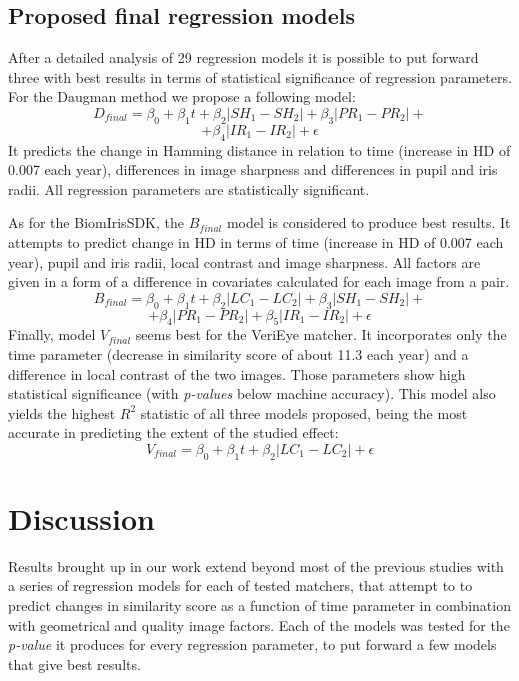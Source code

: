 \documentclass{article}
\begin{document}
\subsection{Proposed final regression models}

After a detailed analysis of 29 regression models it is possible to put forward three with best results in terms of statistical significance of regression parameters. For the Daugman method we propose a following model:
$$D_{final} = \beta_0 + \beta_{1}t + \beta_{2}|SH_{1} - SH_{2}| + \beta_{3}|PR_{1} - PR_{2}| +$$
$$+ \beta_{4}|IR_{1} - IR_{2}| + \epsilon$$
It predicts the change in Hamming distance in relation to time (increase in HD of 0.007 each year), differences in image sharpness and differences in pupil and iris radii. All regression parameters are statistically significant.

As for the BiomIrisSDK, the $B_{final}$ model is considered to produce best results. It attempts to predict change in HD in terms of time (increase in HD of 0.007 each year), pupil and iris radii, local contrast and image sharpness. All factors are given in a form of a difference in covariates calculated for each image from a pair.
$$B_{final} = \beta_0 + \beta_{1}t + \beta_{2}|LC_{1} - LC_{2}| + \beta_{3}|SH_{1} - SH_{2}| +$$
$$+ \beta_{4}|PR_{1} - PR_{2}| + \beta_{5}|IR_{1} - IR_{2}| + \epsilon$$
Finally, model $V_{final}$ seems best for the VeriEye matcher. It incorporates only the time parameter (decrease in similarity score of about 11.3 each year) and a difference in local contrast of the two images. Those parameters show high statistical significance (with \emph{p-values} below machine accuracy). This model also yields the highest $R^2$ statistic of all three models proposed, being the most accurate in predicting the extent of the studied effect:
$$V_{final} = \beta_0 + \beta_{1}t + \beta_{2}|LC_{1} - LC_{2}| + \epsilon$$

\section{Discussion}
Results brought up in our work extend beyond most of the previous studies with a series of regression models for each of tested matchers, that attempt to to predict changes in similarity score as a function of time parameter in combination with geometrical and quality image factors. Each of the models was tested for the \emph{p-value} it produces for every regression parameter, to put forward a few models that give best results. 
		
\end{document}
